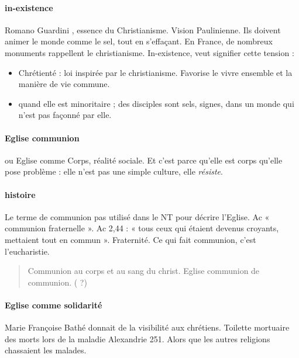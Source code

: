 \paragraph{in-existence} Romano Guardini , essence du Christianisme. Vision Paulinienne. Ils doivent animer le monde comme le sel, tout en s’effaçant. 
En France, de nombreux monuments rappellent le christianisme. In-existence, veut signifier cette tension : 
\begin{itemize}
\item Chrétienté : loi inspirée par le christianisme. Favorise le vivre ensemble et la manière de vie commune.
\item quand elle est minoritaire ; des disciples sont sels, signes, dans un monde qui n’est pas façonné par elle.
\end{itemize}

\paragraph{Eglise communion} ou Eglise comme Corps, réalité sociale. Et c’est parce qu’elle est corps qu’elle pose problème : elle n’est pas une simple culture, elle \textit{résiste}.

\paragraph{histoire} Le terme de communion pas utilisé dans le NT pour décrire l’Eglise. Ac « communion fraternelle ». Ac 2,44 : « tous ceux qui étaient devenus croyants, mettaient tout en commun ». Fraternité. Ce qui fait communion, c’est l’eucharistie.
\begin{quote}
Communion au corps et au sang du christ. Eglise communion de communion.
( ?)
\end{quote}

\paragraph{Eglise comme solidarité} Marie Françoise Bathé donnait de la visibilité aux chrétiens. Toilette mortuaire des morts lors de la maladie Alexandrie 251. Alors que les autres religions chassaient les malades.

